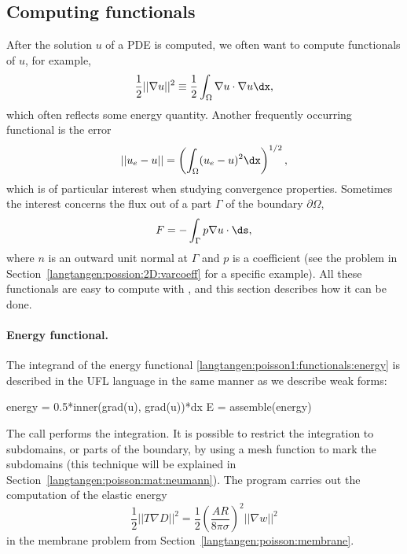 \subsection{Computing functionals}
\label{langtangen:poisson1:functionals}

After the solution $u$ of a PDE is computed, we often want to compute
functionals of $u$, for example,
\begin{equation}
  \frac{1}{2} ||\nabla u||^2 \equiv \frac{1}{2}\int_\Omega \nabla u\cdot \nabla u\dx,
\label{langtangen:poisson1:functionals:energy}
\end{equation}
which often reflects some energy quantity.  Another frequently
occurring functional is the error
\begin{equation}
  ||u_e-u|| = \left(\int_\Omega (u_e-u)^2\dx\right)^{1/2},
\label{langtangen:poisson1:functionals:error}
\end{equation}
which is of particular interest when studying convergence properties.
Sometimes the interest concerns the flux out of a part $\Gamma$ of the
boundary $\partial\Omega$,
\begin{equation}
  F = -\int_\Gamma p\nabla u\cdot  \ds,
\label{langtangen:poisson1:functionals:flux}
\end{equation}
where $n$ is an outward unit normal
at $\Gamma$ and $p$ is a coefficient (see the problem in
Section~\ref{langtangen:possion:2D:varcoeff} for a specific example).
All these functionals are easy to compute with \fenics, and this section
describes how it can be done.

\paragraph{Energy functional.}
The integrand of the energy functional
\eqref{langtangen:poisson1:functionals:energy} is described in the UFL
language in the same manner as we describe weak forms:
\begin{python}
energy = 0.5*inner(grad(u), grad(u))*dx
E = assemble(energy)
\end{python}
The  call performs the integration.  It is possible to
restrict the integration to subdomains, or parts of the boundary,
by using a mesh function to mark the subdomains (this technique will be
explained
in Section~\ref{langtangen:poisson:mat:neumann}).  The program
 carries out the computation of the elastic energy
\begin{equation}
   \frac{1}{2}||T\nabla D||^2 = \frac{1}{2}\left(\frac{AR}{8\pi\sigma}\right)^2
    ||\nabla w||^2
\end{equation}
in the membrane problem from Section~\ref{langtangen:poisson:membrane}.

